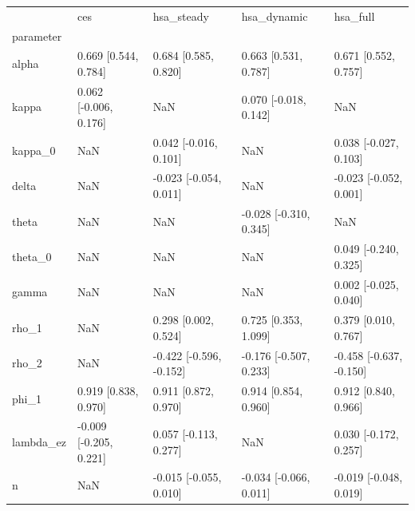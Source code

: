 \begin{tabular}{lllll}
\toprule
 & ces & hsa\_steady & hsa\_dynamic & hsa\_full \\
parameter &  &  &  &  \\
\midrule
alpha & 0.669 [0.544, 0.784] & 0.684 [0.585, 0.820] & 0.663 [0.531, 0.787] & 0.671 [0.552, 0.757] \\
kappa & 0.062 [-0.006, 0.176] & NaN & 0.070 [-0.018, 0.142] & NaN \\
kappa\_0 & NaN & 0.042 [-0.016, 0.101] & NaN & 0.038 [-0.027, 0.103] \\
delta & NaN & -0.023 [-0.054, 0.011] & NaN & -0.023 [-0.052, 0.001] \\
theta & NaN & NaN & -0.028 [-0.310, 0.345] & NaN \\
theta\_0 & NaN & NaN & NaN & 0.049 [-0.240, 0.325] \\
gamma & NaN & NaN & NaN & 0.002 [-0.025, 0.040] \\
rho\_1 & NaN & 0.298 [0.002, 0.524] & 0.725 [0.353, 1.099] & 0.379 [0.010, 0.767] \\
rho\_2 & NaN & -0.422 [-0.596, -0.152] & -0.176 [-0.507, 0.233] & -0.458 [-0.637, -0.150] \\
phi\_1 & 0.919 [0.838, 0.970] & 0.911 [0.872, 0.970] & 0.914 [0.854, 0.960] & 0.912 [0.840, 0.966] \\
lambda\_ez & -0.009 [-0.205, 0.221] & 0.057 [-0.113, 0.277] & NaN & 0.030 [-0.172, 0.257] \\
n & NaN & -0.015 [-0.055, 0.010] & -0.034 [-0.066, 0.011] & -0.019 [-0.048, 0.019] \\
\bottomrule
\end{tabular}
